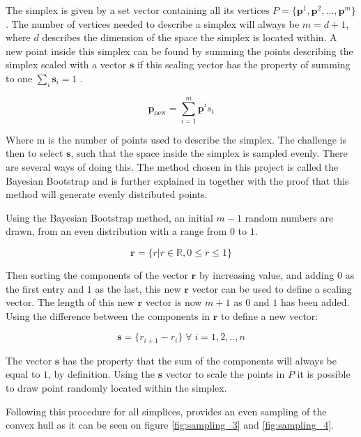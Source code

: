 The simplex is given by a set vector containing all its vertices $P = \{\mathbf{p}^1,\mathbf{p}^2,...,\mathbf{p}^m\}$. The number of vertices needed to describe a simplex will always be $m = d+1$, where $d$ describes the dimension of the space the simplex is located within. 
A new point inside this simplex can be found by summing the points describing the simplex scaled with a vector $\mathbf{s}$ if this scaling vector has the property of summing to one $\sum_i \mathbf{s}_i = 1$ . 

\begin{equation}
	\mathbf{p}_{\text{new}} = \sum_{i=1}^m \mathbf{p}^i s_i
\end{equation}

Where m is the number of points used to describe the simplex. The challenge is then to select $\mathbf{s}$, such that the space inside the simplex is sampled evenly. There are several ways of doing this. The method chosen in this project is called the Bayesian Bootstrap and is further explained in \cite{Bayesian_Bootstrap} together with the proof that this method will generate evenly distributed points. 

Using the Bayesian Bootstrap method, an initial $m-1$ random numbers are drawn, from an even distribution with a range from $0$ to $1$. 

\begin{equation}
	\mathbf{r} = \{r | r \in \mathbb{R} , 0\leq r\leq 1 \}
\end{equation}

Then sorting the components of the vector $\mathbf{r}$ by increasing value, and adding $0$ as the first entry and  $1$ as the last, this new $\mathbf{r}$ vector can be used to define a scaling vector. The length of this new $\mathbf{r}$ vector is now $m+1$ as $0$ and $1$ has been added. Using the difference between the components in $\mathbf{r}$ to define a new vector: 

\begin{equation}
	\mathbf{s} = \{r_{i+1} - r_i \} \; \forall \; i=1,2,..,n
\end{equation}

The vector $\mathbf{s}$ has the property that the sum of the components will always be equal to $1$, by definition. Using the $\mathbf{s}$ vector to scale the points in $P$ it is possible to draw point randomly located within the simplex.

Following this procedure for all simplices, provides an even sampling of the convex hull as it can be seen on figure \ref{fig:sampling_3} and \ref{fig:sampling_4}.

